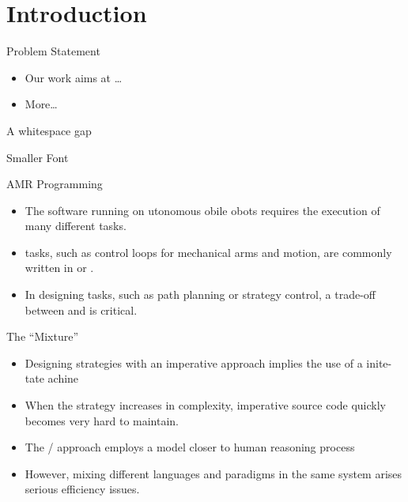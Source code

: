 \section{Introduction}

%
\begin{frame}{Problem Statement}  
  \begin{itemize}
    \item Our work aims at \ldots
    \item More\dots
  \end{itemize}
  \vfill
  A whitespace gap\\
  \begin{tiny}
    Smaller Font
  \end{tiny}
\end{frame}
%
\begin{frame}[label=1]{AMR Programming}
  \begin{itemize}
    \item
      The software running on utonomous obile obots
      requires the execution of many different tasks.
\N  
    \item
       tasks, such as control loops for mechanical arms 
      and motion, are commonly written in  or 
      .
    \item
    In designing  tasks, such as path planning 
    or strategy control, a trade-off between  and 
     is critical.
\N
  \end{itemize}
\N
\end{frame}


\begin{frame}[label=2]{The ``Mixture''}
  \begin{itemize}
    \item
      Designing strategies with an imperative approach implies the use of a inite-tate achine
    \item
      When the strategy increases in complexity, imperative source code quickly becomes very hard to maintain.
\pause
    \N\N
    \item
    The / approach employs a model closer to human reasoning process 
\N    
 

\item
    However, mixing different languages and paradigms in the same system arises serious efficiency issues.
 

\end{itemize}
\N\N
\end{frame}



